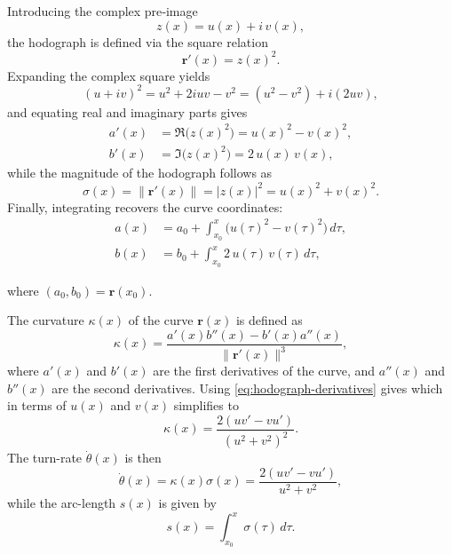 Introducing the complex pre‐image
\begin{equation*}
    z(x) = u(x) + i\,v(x),
\end{equation*}
the hodograph is defined via the square relation
\begin{equation}\label{eq:hodograph-square}
    \mathbf r'(x) = z(x)^2.
\end{equation}
Expanding the complex square yields
\begin{equation*}
    (u + i v)^2 = u^2 + 2iuv - v^2 = (u^2 - v^2) + i(2uv),
\end{equation*}
and equating real and imaginary parts gives
\begin{subequations}\label{eq:hodograph-derivatives}
    \begin{align}
        a'(x) &= \Re\bigl(z(x)^2\bigr) = u(x)^2 - v(x)^2, \label{eq:hodograph-derivatives-a}\\
        b'(x) &= \Im\bigl(z(x)^2\bigr) = 2\,u(x)\,v(x), \label{eq:hodograph-derivatives-b}
    \end{align}
\end{subequations}
while the magnitude of the hodograph follows as
\begin{equation*}
    \sigma(x) = \|\mathbf r'(x)\| = |z(x)|^2 = u(x)^2 + v(x)^2.
\end{equation*}
Finally, integrating recovers the curve coordinates:
\begin{equation*}
    \begin{aligned}
        a(x) &= a_0 + \int_{x_0}^{x}\bigl(u(\tau)^2 - v(\tau)^2\bigr)\,d\tau,\\
        b(x) &= b_0 + \int_{x_0}^{x}2\,u(\tau)\,v(\tau)\,d\tau,
    \end{aligned}
\end{equation*}

where $(a_0,b_0)=\mathbf r(x_0)$.

The curvature $\kappa(x)$ of the curve $\mathbf r(x)$ is defined as
\begin{equation*}
    \kappa(x) = \frac{a'(x)b''(x) - b'(x)a''(x)}{\|\mathbf r'(x)\|^3},
\end{equation*}
where $a'(x)$ and $b'(x)$ are the first derivatives of the curve, and $a''(x)$ and $b''(x)$ are the second derivatives. Using \cref{eq:hodograph-derivatives} gives
which in terms of $u(x)$ and $v(x)$ simplifies to
\begin{equation}\label{eq:curvature}
    \kappa(x) = \frac{2(uv'-vu')}{(u^2+v^2)^2}.
\end{equation}
The turn-rate $\dot\theta(x)$ is then
\begin{equation}\label{eq:turn-rate}
    \dot\theta(x) = \kappa(x) \sigma(x) = \frac{2(uv'-vu')}{u^2+v^2},
\end{equation}
while the arc-length $s(x)$ is given by
\begin{equation*}
    s(x) = \int_{x_0}^{x}\sigma(\tau)\,d\tau.
\end{equation*}



